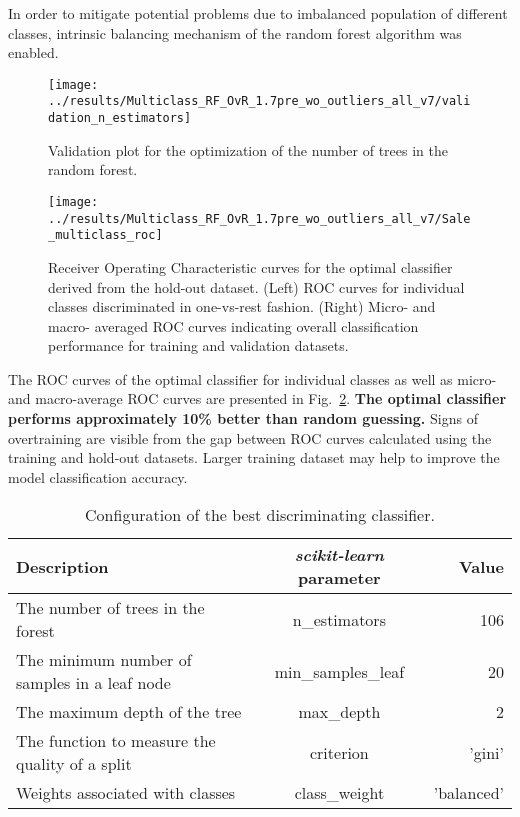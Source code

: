 \documentclass[14pt]{scrartcl}
\begin{document}
In order to mitigate potential problems due to imbalanced population of different classes,
intrinsic balancing mechanism of the random forest algorithm was enabled.

\begin{figure}[htpb!]
   \centering
   \texttt{[image: ../results/Multiclass\_RF\_OvR\_1.7pre\_wo\_outliers\_all\_v7/validation\_n\_estimators]}\\
   \caption{Validation plot for the optimization of the number of trees in the
   random forest.}
   \label{fig:validation_n_estimators}
\end{figure}
\begin{figure}[htpb!]
    \centering
    \texttt{[image: ../results/Multiclass\_RF\_OvR\_1.7pre\_wo\_outliers\_all\_v7/Sale\_multiclass\_roc]}\\
    \caption{Receiver Operating Characteristic curves for the optimal
    classifier derived from the hold-out dataset. (Left) ROC curves for individual classes discriminated in one-vs-rest
    fashion. (Right) Micro- and macro- averaged ROC curves indicating overall
    classification performance for training and validation datasets.}
    \label{fig:roc_curves}
 \end{figure}

The ROC curves of the optimal classifier for individual classes as well as micro-
and macro-average ROC curves are presented in Fig.~\ref{fig:roc_curves}. \textbf{The optimal
classifier performs approximately 10\% better than random guessing.} Signs of
overtraining are visible from the gap between ROC curves calculated using the
training and hold-out datasets. Larger training dataset may help to improve the model
classification accuracy.

\begin{table}[htpb!]
    \centering
    \begin{tabular}{ l c | r }
        Description & \textbf{\textsl{scikit-learn}} parameter & Value \\
        \hline
        The number of trees in the forest & n\_estimators & 106 \\
        The minimum number of samples in a leaf node & min\_samples\_leaf & 20 \\
        The maximum depth of the tree & max\_depth & 2 \\
        The function to measure the quality of a split & criterion & 'gini' \\
        Weights associated with classes  & class\_weight & 'balanced'\\
    \end{tabular}
    \caption{Configuration of the best discriminating classifier.}\label{tab:rf_params}
\end{table}
\end{document}
